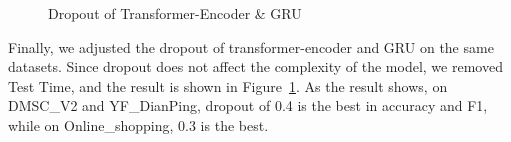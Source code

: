 \begin{figure}
	\centering
    \quad
    \quad
	\caption{Dropout of Transformer-Encoder \& GRU}
	\label{fig:Dropout_Transformer-Encoder}       %
\end{figure}
Finally, we adjusted the dropout of transformer-encoder and GRU on the same datasets. Since dropout does not affect the complexity of the model, we removed Test Time, and the result is shown in Figure~\ref{fig:Dropout_Transformer-Encoder}. As the result shows, on DMSC\_V2 and YF\_DianPing, dropout of 0.4 is the best in accuracy and F1, while on Online\_shopping, 0.3 is the best.
